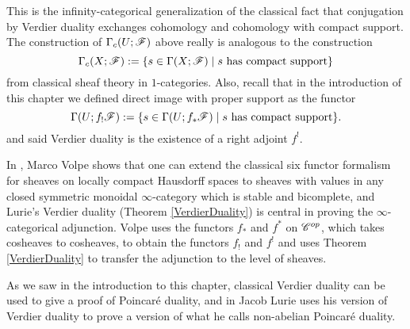 \documentclass[../../thesis.tex]{subfiles}
\begin{document}
\begin{remark}
    This is the infinity-categorical generalization of the classical fact that conjugation by Verdier duality exchanges cohomology and cohomology with compact support.
    The construction of $\Gamma_c(U;\mathscr{F})$ above really is analogous to the construction
    \[
        \Gamma_c(X ; \mathscr{F}) := \{ s \in \Gamma(X; \mathscr{F}) \mid s\text{ has compact support}\}
    \]
    from classical sheaf theory in $1$-categories.
    Also, recall that in the introduction of this chapter we defined direct image with proper support as the functor
    \[
        \Gamma(U; f_!\mathscr{F}) : = \{ s \in \Gamma(U; f_*\mathscr{F}) \mid s \text{ has compact support}\}.
    \]
    and said Verdier duality is the existence of a right adjoint $f^!$.


    In \cite{Volpe}, Marco Volpe shows that one can extend the classical six functor formalism for sheaves on locally compact Hausdorff spaces to sheaves with values in any closed symmetric monoidal $\infty$-category which is stable and bicomplete, and Lurie's Verdier duality (Theorem \ref{VerdierDuality}) is central in proving the $\infty$-categorical adjunction.
    Volpe uses the functors $f_*$ and $f^*$ on $\mathscr{C}^{op}$, which takes cosheaves to cosheaves, to obtain the functors $f_!$ and $f^!$ and uses Theorem \ref{VerdierDuality} to transfer the adjunction to the level of sheaves.
\end{remark}
\begin{remark}
    As we saw in the introduction to this chapter, classical Verdier duality can be used to give a proof of Poincaré duality, and in \cite[Section 5.5.6]{HA} Jacob Lurie uses his version of Verdier duality to prove a version of what he calls non-abelian Poincaré duality.
\end{remark}
\end{document}
